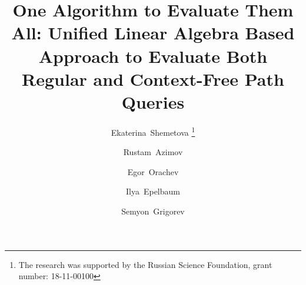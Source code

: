 \newlength\Origarrayrulewidth

\newcommand{\Cline}[1]{%
	\noalign{\global\setlength\Origarrayrulewidth{\arrayrulewidth}}%
	\noalign{\global\setlength\arrayrulewidth{3pt}}\cline{#1}%
	\noalign{\global\setlength\arrayrulewidth{\Origarrayrulewidth}}%
}

\newcommand\Thickvrule[1]{%
	\multicolumn{1}{!{\vrule width 2pt}c!{\vrule width 2pt}}{#1}%
}

\newcommand\Thickvrulel[1]{%
	\multicolumn{1}{!{\vrule width 2pt}c}{#1}%
}

\newcommand\Thickvruler[1]{%
	\multicolumn{1}{c!{\vrule width 2pt}}{#1}%
}

\newcommand\mc{\multicolumn{1}{c}{\cellcolor{lightgray}\textbf{1}}}
\newcommand{\term}[1]{\emph{#1}}
%
%




\title{One Algorithm to Evaluate Them All: Unified Linear Algebra Based Approach to Evaluate Both Regular and Context-Free Path Queries%
}


\author{Ekaterina~Shemetova  \thanks {The research was supported by the Russian Science Foundation, grant number: 18-11-00100}       \and
        Rustam~Azimov \and
            Egor~Orachev \and
             Ilya~Epelbaum \and
             Semyon~Grigorev
}


